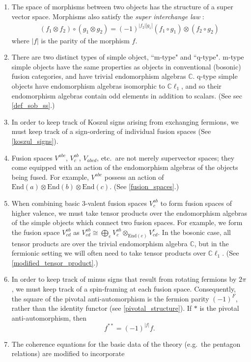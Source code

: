 \documentclass[12pt,a4paper]{article}
\newcommand{\tp}{\otimes}
\newcommand{\cc}{\mathbb{C}}
\newcommand\be            {\begin{equation}}
\newcommand\ee            {\end{equation}}
\newcommand{\End}{\text{End}}
\newcommand{\cl}{\mathbb{C}\ell}
\begin{document}
\begin{enumerate}
	\item The space of morphisms between two objects has the structure of 
	a super vector space.
	Morphisms also satisfy the {\em super interchange law} \cite{usher2016}:
	\begin{align}
	(f_1\tp f_2) \circ (g_1\tp g_2) = (-1)^{|f_2| |g_1|} (f_1\circ g_1)\tp (f_2\circ g_2)
	\end{align}
	where $|f|$ is the parity of the morphism $f$. 
	\item There are two distinct types of simple object, ``m-type" and ``q-type".
	m-type simple objects have the same properties as objects in conventional (bosonic) fusion categories, and have trivial endomorphism algebras $\cc$.  
	q-type simple objects have endomorphism algebras isomorphic to $\cl_1$, and so their endomorphism algebras contain odd elements in addition to scalars. (See sec \ref{def_sob_ss}.)
		\item In order to keep track of Koszul signs arising from exchanging fermions, 
	we must keep track of a sign-ordering of individual fusion spaces (See \ref{koszul_signs}).
	\item Fusion spaces $V^{abc}$, $V^{ab}_c$, $V_{abcd}$, etc.\ are not merely supervector spaces; they come equipped with an action of the
	endomorphism algebras of the objects being fused. 
	For example, $V^{abc}$ possess an action of $\End(a)\tp \End(b)\tp \End(c)$.
	(See \ref{fusion_spaces}.)
	\item When combining basic 3-valent fusion spaces $V^{ab}_c$ to form fusion spaces of higher valence, we must take
	tensor products over the endomorphism algebras of the simple objects which connect two fusion spaces. 
	For example, we form the fusion space $V^{ab}_{cd}$ as $V^{ab}_{cd} \cong \bigoplus_e V^{ab}_c \tp_{\End(e)} V^e_{cd}$.
	In the bosonic case, all tensor products are over the trivial endomorphism algebra $\cc$, but in the fermionic setting we will often need to take tensor products over $\cl_1$. 
	(See \ref{modified_tensor_product}.)
	\item In order to keep track of minus signs that result from rotating fermions by $2\pi$, we must keep track of a spin-framing at each fusion space. 
	Consequently, the square of the pivotal anti-automorphism is 
	the fermion parity $(-1)^F$, rather than the identity functor (see \ref{pivotal_structure}). If $*$ is the pivotal anti-automorphism, then 
	\be f^{**} = (-1)^{|f|}f.\ee
	\item The coherence equations for the basic data of the theory (e.g.\ the pentagon relations) are modified to incorporate  

\end{enumerate}
\end{document}
